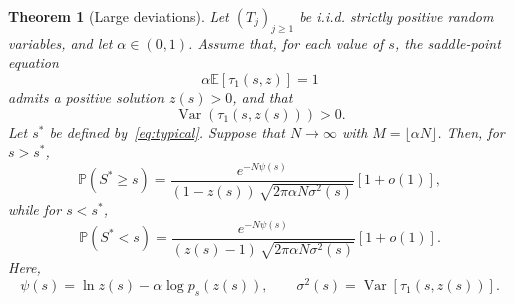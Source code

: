 \documentclass[10pt,a4paper]{amsart}
\newtheorem{thm}{Theorem}
\def\EE{{\mathbb E}}
\def\PP{{\mathbb P}}
\begin{document}
\begin{thm}[Large deviations]
\label{thm:LD}
Let $(T_j)_{j\geq1}$ be i.i.d. strictly positive random variables, and 
let $\alpha\in (0,1)$. Assume that, for each value of $s$, 
the saddle-point equation
\begin{equation}
\label{eq:assump1}
    \alpha \EE[\tau_1(s,z)]=1
\end{equation}
admits a positive solution $z(s)>0$, and that
\begin{equation}
\label{eq:assump2}
    \operatorname{Var}(\tau_1(s,z(s)))>0.
\end{equation}
Let $s^*$ be defined by~\eqref{eq:typical}. Suppose that $N\to\infty$ with $M=\lfloor \alpha N\rfloor$. Then, for $s>s^*$,
\begin{equation}\label{eq:right-box}
 \PP(S^*\ge s) =
  \frac{e^{-N\psi(s)}}{(1{-}z(s))\,
  \sqrt{2\pi \alpha N\sigma^2(s)}}\left[1+o(1)\right],
\end{equation}
while for $s<s^*$,
\begin{equation}\label{eq:left-box}
\PP(S^*<s) =
  \frac{e^{-N\psi(s)}}{(z(s){-}1)\,
  \sqrt{2\pi \alpha N\sigma^2(s)}}\left[1+o(1)\right].
\end{equation}
Here, 
    \begin{equation}\label{eq:psi}
    \psi(s)=\ln z(s)-\alpha\log p_s(z(s)),\qquad\sigma^2(s) =\operatorname{Var}[\tau_1(s,z(s))]. 
    \end{equation}
\end{thm}
\end{document}
